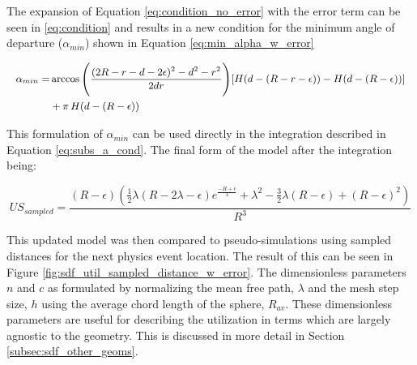 The expansion of Equation \ref{eq:condition_no_error} with the error term can be seen
in \ref{eq:condition} and results in a new condition for the minimum angle of
departure ($\alpha_{min}$) shown in Equation \ref{eq:min_alpha_w_error}

\begin{equation}
\small
\begin{split}
\alpha_{min} =& \arccos\Bigg ( \frac{(2R-r-d-2\epsilon)^2-d^2-r^2}{2 d r} \Bigg )[H(d-(R-r-\epsilon))-H(d-(R-\epsilon))]  \\
&+ \pi \, H(d-(R-\epsilon))
\end{split}
\label{eq:min_alpha_w_error}
\end{equation}

This formulation of $\alpha_{min}$ can be used directly in the integration described
in Equation \ref{eq:subs_a_cond}. The final form of the model after the integration being:

\begin{equation}
  US_{sampled} = \frac{(R-\epsilon) (\frac{1}{2} \lambda ( R - 2\lambda - \epsilon ) e^{\frac{-R + \epsilon}{\lambda}} + \lambda^{2} - \frac{3}{2}\lambda(R - \epsilon) + (R-\epsilon)^{2})}{R^3}
  \label{eq:sdf_util_sampled_w_error}
\end{equation}



This updated model was then compared to pseudo-simulations using sampled
distances for the next physics event location. The result of this can be seen in
Figure \ref{fig:sdf_util_sampled_distance_w_error}. The dimensionless parameters
$n$ and $c$ as formulated by normalizing the mean free path, $\lambda$ and the
mesh step size, $h$ using the average chord length of the sphere,
$R_{av}$. These dimensionless parameters are useful for describing the
utilization in terms which are largely agnostic to the geometry. This is
discussed in more detail in Section \ref{subsec:sdf_other_geoms}.

